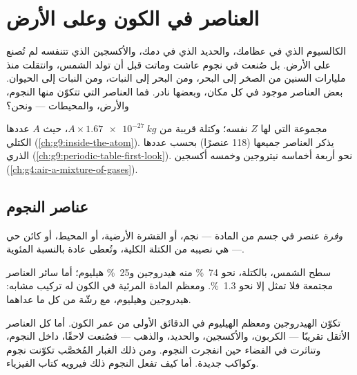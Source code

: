 \chapter{العناصر في الكون وعلى الأرض}\label{ch:g9:elements-universe-earth}

الكالسيوم الذي في عظامك، والحديد الذي في دمك، والأكسجين الذي تتنفسه لم
تُصنع على الأرض. بل صُنعت في نجوم عاشت وماتت قبل أن تولد الشمس، وانتقلت
منذ مليارات السنين من الصخر إلى البحر، ومن البحر إلى النبات، ومن النبات إلى
الحيوان. بعض العناصر موجود في كل مكان، وبعضها نادر. فما العناصر التي تتكوّن
منها النجوم، والأرض، والمحيطات --- ونحن؟

\begin{recall}
 مجموعة  التي لها  $Z$ نفسه؛ وكتلة 
قريبة من $A \times \qty{1.67e-27}{kg}$، حيث $A$ عددها الكتلي
(\cref{ch:g9:inside-the-atom}).  يذكر العناصر جميعها (118 عنصرًا) بحسب
عددها الذري (\cref{ch:g9:periodic-table-first-look}).  نحو أربعة
أخماسه نيتروجين وخمسه أكسجين (\cref{ch:g4:air-a-mixture-of-gases}).
\end{recall}

\section{عناصر النجوم}

\begin{definition}[الوفرة]\label{def:g9:elements-universe-earth:abundance}
\emph{وفرة} عنصر في جسم من المادة --- نجم، أو القشرة الأرضية،
أو المحيط، أو كائن حي --- هي نصيبه من الكتلة الكلية، وتُعطى عادة
بالنسبة المئوية.
\end{definition}

\begin{proposition}\label{prop:g9:elements-universe-earth:sun}
سطح الشمس، بالكتلة، نحو \qty{74}{\percent} منه هيدروجين و\qty{25}{\percent}
هيليوم؛ أما سائر العناصر مجتمعة فلا تمثل إلا نحو \qty{1.3}{\percent}. ومعظم
المادة المرئية في الكون له تركيب مشابه: هيدروجين وهيليوم، مع رشّة من كل
ما عداهما.
\end{proposition}

\begin{proposition}\label{prop:g9:elements-universe-earth:stars}
تكوّن الهيدروجين ومعظم الهيليوم في الدقائق الأولى من عمر الكون. أما كل العناصر
الأثقل تقريبًا --- الكربون، والأكسجين، والحديد، والذهب --- فصُنعت لاحقًا،
داخل النجوم، وتناثرت في الفضاء حين انفجرت النجوم. ومن ذلك الغبار المُخصَّب
تكوّنت نجوم وكواكب جديدة. أما كيف تفعل النجوم ذلك فيرويه كتاب الفيزياء.
\end{proposition}

